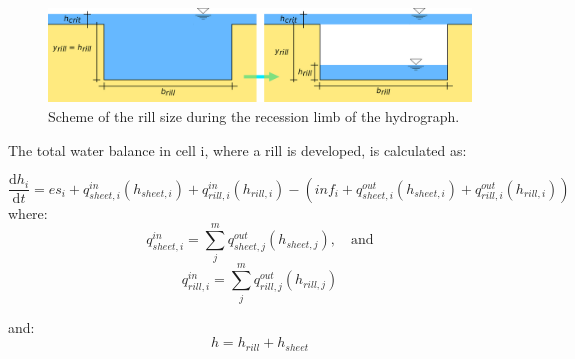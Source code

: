             \begin{figure}[t]
                \includegraphics[width=1\linewidth]{./img/rill_schema_prazdneni.png}
                \caption{Scheme of the rill size during the recession limb of the hydrograph.}
                \label{fig:rill_prazdneni}
            \end{figure}

            The total water balance in cell i, where a rill is developed, is calculated as:

            \begin{equation}
                \frac{\mathrm{d}h_i}{\mathrm{d}t} = es_i + q^{in}_{sheet,i}(h_{sheet,i})
                +q^{in}_{rill,i}(h_{rill,i}) - (inf_i + q^{out}_{sheet,i}(h_{sheet,i}) +
                q^{out}_{rill,i}(h_{rill,i}))
            \end{equation}
            where:
            \begin{equation}
                q^{in}_{sheet,i} = \sum_j^m q^{out}_{sheet, j}(h_{sheet,j}),\quad \mathrm{and}
            \end{equation}
            \begin{equation}
                q^{in}_{rill,i} = \sum_j^m q^{out}_{rill, j}(h_{rill,j})
            \end{equation}

            and:
            \begin{equation}
               h = h_{rill} + h_{sheet}  
            \end{equation}

